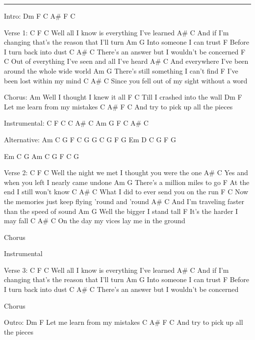 \noindent\rule{\columnwidth}{1pt}

\begin{multicols}{2}
\begin{lstsong}
Intro: Dm F C A# F C

Verse 1:
C                 F               C
Well all I know is everything I've learned
                              A#               C
And if I'm changing that's the reason that I'll turn
   Am             G
Into someone I can trust
        F
Before I turn back into dust
          C            A#          C
There's an answer but I wouldn't be concerned
                      F                 C
Out of everything I've seen and all I've heard
                        A#               C
And everywhere I've been around the whole wide world
      Am                       G
There's still something I can't find
         F
I've been lost within my mind
         C              A#            C
Since you fell out of my sight without a word
 
Chorus:
      Am
Well I thought I knew it all
      F                C
Till I crashed into the wall
Dm                  F
Let me learn from my mistakes
                          C        A# F C
And try to pick up all the pieces

Instrumental:
C F C
C A# C
Am G F
C A# C

Alternative: Am C G F C G
G C G  F G
Em D C  G F G

Em    C   G
Am    C   G   F C G
\end{lstsong}
\columnbreak
\begin{lstsong}
Verse 2:
C                    F             C
Well the night we met I thought you were the one
                       A#          C
Yes and when you left I nearly came undone
      Am                  G
There's a million miles to go
      F
At the end I still won't know
          C       A#              C
What I did to ever send you on the run
                          F                 C
Now the memories just keep flying 'round and 'round
                            A#            C
And I'm traveling faster than the speed of sound
       Am              G
Well the bigger I stand tall
        F
It's the harder I may fall
      C                A#        C
On the day my vices lay me in the ground

Chorus

Instrumental 

Verse 3:
C                 F               C
Well all I know is everything I've learned
                              A#               C
And if I'm changing that's the reason that I'll turn
   Am             G
Into someone I can trust
        F
Before I turn back into dust
          C            A#          C
There's an answer but I wouldn't be concerned

Chorus

Outro:
Dm                  F
Let me learn from my mistakes
                          C        A# F C
And try to pick up all the pieces
\end{lstsong}
\end{multicols}
\newpage

